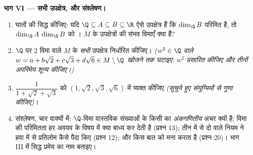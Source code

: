 \begin{problem}
\medskip \noindent\textbf{भाग VI --- सभी उपक्षेत्र, और संश्लेषण।}
\begin{enumerate}[resume]
  \item घातों की  सिद्ध कीजिए: यदि $\Q \subseteq A \subseteq B
  \subseteq \R$ ऐसे उपक्षेत्र हैं कि $\dim_\Q B$ परिमित है, तो $\dim_\Q A$
  $\dim_\Q B$ को । $M$ के उपक्षेत्रों की संभव विमाएँ क्या
  हैं?
  \item $\Q$ पर $2$ विमा वाले $M$ के \emph{सभी} उपक्षेत्र निर्धारित कीजिए।
  \emph{($w^2 \in \Q$ वाले $w = a + b\sqrt2 + c\sqrt3 + d\sqrt6 \in M
  \setminus \Q$ खोजने तक घटाइए: $w^2$ प्रसारित कीजिए और तीनों अपरिमेय
   शून्य कीजिए।)}
  \item $\dfrac1{1 + \sqrt2 + \sqrt3}$ को  $(1, \sqrt2, \sqrt3, \sqrt6)$
  में व्यक्त कीजिए \emph{(सुचुने हुए संयुग्मियों से गुणा कीजिए)}।
  \item संश्लेषण, चार वाक्यों में: $\Q$-विमा वास्तविक संख्याओं के किसी
   का \emph{अंकगणितीय} अचर क्यों है; विमा की परिमितता हर अवयव के विषय
  में क्या बाध्य कर देती है (प्रश्न 13); तीन में से दो वाले नियम ने हवा में
  से प्रतिलोम कैसे पैदा किए (प्रश्न 12); और  किस बात को मना करता
  है (प्रश्न 20)। भाग III में सिद्ध प्रमेय का नाम बताइए।
\end{enumerate}
\end{problem}
